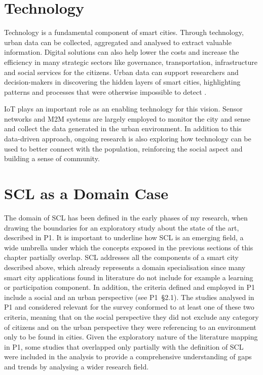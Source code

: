 \section{Technology}

Technology is a fundamental component of smart cities. Through technology, urban data can be collected, aggregated and analysed to extract valuable information. Digital solutions can also help lower the costs and increase the efficiency in many strategic sectors like governance, transportation, infrastructure and social services for the citizens. Urban data can support researchers and decision-makers in discovering the hidden layers of smart cities, highlighting patterns and processes that were otherwise impossible to detect \autocite{vazifeh_addressing_2018}.

IoT plays an important role as an enabling technology for this vision. Sensor networks and M2M systems are largely employed to monitor the city and sense and collect the data generated in the urban environment. In addition to this data-driven approach, ongoing research is also exploring how technology can be used to better connect with the population, reinforcing the social aspect and building a sense of community.


\section{SCL as a Domain Case}

The domain of SCL has been defined in the early phases of my research, when drawing the boundaries for an exploratory study about the state of the art, described in P1. It is important to underline how SCL is an emerging field, a wide umbrella under which the concepts exposed in the previous sections of this chapter partially overlap. SCL addresses all the components of a smart city described above, which already represents a domain specialisation since many smart city applications found in literature do not include for example a learning or participation component. In addition, the criteria defined and employed in P1 include a social and an urban perspective (see P1~\S2.1).
The studies analysed in P1 and considered relevant for the survey conformed to at least one of these two criteria, meaning that on the social perspective they did not exclude any category of citizens and on the urban perspective they were referencing to an environment only to be found in cities. Given the exploratory nature of the literature mapping in P1, some studies that overlapped only partially with the definition of SCL were included in the analysis to provide a comprehensive understanding of gaps and trends by analysing a wider research field.

